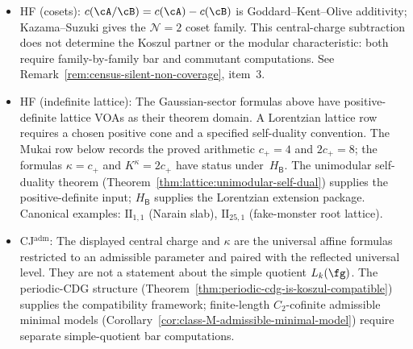 \begin{itemize}[leftmargin=*]
 is $4 = 1\,(T) + 3\,(W^{\pm}, W^{0})$. Tempering of
 $\cW(p)$ is conjectural per
 Remark~\ref{rem:census-silent-non-coverage};
 Gurarie (1993) and Flohr (1996) construct unbounded
 Massey amplitudes, so the Adamovi\'c--Milas
 character-amplitude bound remains a frontier.
 \item HF (cosets): $c(\cA/\cB) = c(\cA) - c(\cB)$ is
 Goddard--Kent--Olive additivity; Kazama--Suzuki gives the
 $\mathcal{N}{=}2$ coset family. This central-charge subtraction does
 not determine the Koszul partner or the modular characteristic:
 both require family-by-family bar and commutant computations. See
 Remark~\ref{rem:census-silent-non-coverage}, item~3.
 \item HF (indefinite lattice): The Gaussian-sector formulas above
 have positive-definite lattice VOAs as their theorem domain.  A
 Lorentzian lattice row requires a chosen positive cone and a specified
 self-duality convention.  The Mukai row below records the proved
 arithmetic $c_+=4$ and $2c_+=8$; the formulas
 $\kappa=c_+$ and $K^\kappa=2c_+$ have status
 \ClaimStatusConjectured under~$H_{\mathsf B}$. The unimodular
 self-duality theorem (Theorem~\ref{thm:lattice:unimodular-self-dual})
 supplies the positive-definite input; $H_{\mathsf B}$ supplies the
 Lorentzian extension package.
 Canonical examples: $\mathrm{II}_{1,1}$ (Narain slab),
 $\mathrm{II}_{25,1}$ (fake-monster root lattice).
 \item CJ$^{\mathrm{adm}}$: The displayed central charge and
 $\kappa$ are the universal affine formulas restricted to an
 admissible parameter and paired with the reflected universal level.
 They are not a statement about the simple quotient $L_k(\fg)$.
 The periodic-CDG structure
 (Theorem~\ref{thm:periodic-cdg-is-koszul-compatible}) supplies the
 compatibility framework; finite-length $C_2$-cofinite admissible
 minimal models (Corollary~\ref{cor:class-M-admissible-minimal-model})
 require separate simple-quotient bar computations.
\end{itemize}

